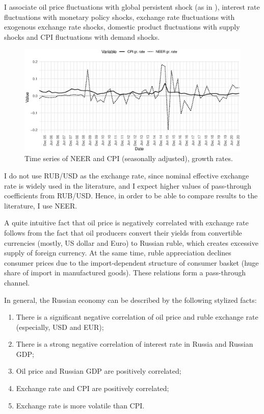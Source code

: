 \documentclass[12pt, a4paper]{extarticle}
\begin{document}
I associate oil price fluctuations with global persistent shock (as in \cite{Forbes2018}), interest rate fluctuations with monetary policy shocks, exchange rate fluctuations with exogenous exchange rate shocks, domestic product fluctuations with supply shocks and CPI fluctuations with demand shocks.
\begin{figure}[b!]
	\centering
	\includegraphics[width=\linewidth]{figures/neer_cpi}
	\caption[]{Time series of NEER and CPI (seasonally adjusted), growth rates.}
	\label{fig:neer_cpi}
\end{figure}

I do not use RUB/USD as the exchange rate, since nominal effective exchange rate is widely used in the literature, and I expect higher values of pass-through coefficients from RUB/USD. Hence, in order to be able to compare results to the literature, I use NEER. 

A quite intuitive fact that oil price is negatively correlated with exchange rate follows from the fact that oil producers convert their yields from convertible currencies (mostly, US dollar and Euro) to Russian ruble, which creates excessive supply of foreign currency. At the same time, ruble appreciation declines consumer prices due to the import-dependent structure of consumer basket (huge share of import in manufactured goods). These relations form a pass-through channel. 

In general, the Russian economy can be described by the following stylized facts:
\begin{enumerate}
	\setlength\itemsep{0.02em}
	\item There is a significant negative correlation of oil price and ruble exchange rate (especially, USD and EUR);
	\item There is a strong negative correlation of interest rate in Russia and Russian GDP;
	\item Oil price and Russian GDP are positively correlated;
	\item Exchange rate and CPI are positively correlated;
	\item Exchange rate is more volatile than CPI.
\end{enumerate}
\end{document}
